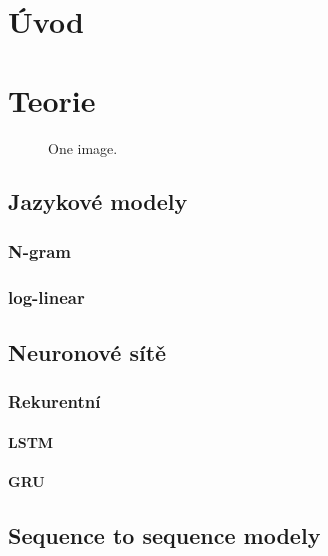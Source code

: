 \chapter{Úvod}

\chapter{Teorie}
\begin{figure}
    \begin{center}
    \end{center}
	\caption{One image. }
	\label{img:TODO}
\end{figure}

\section{Jazykové modely}
\subsection{N-gram}
\subsection{log-linear}

\section{Neuronové sítě}
\subsection{Rekurentní}
\subsubsection{LSTM}
\subsubsection{GRU}

\section{Sequence to sequence modely}
